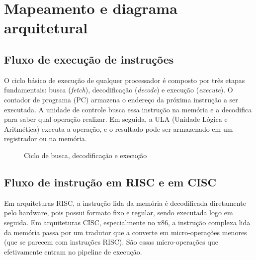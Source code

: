 \chapter{Mapeamento e diagrama arquitetural}
\label{cap:diagramas}

\section{Fluxo de execução de instruções}
O ciclo básico de execução de qualquer processador é composto por três etapas fundamentais: busca (\textit{fetch}), decodificação (\textit{decode}) e execução (\textit{execute}). O contador de programa (PC) armazena o endereço da próxima instrução a ser executada. A unidade de controle busca essa instrução na memória e a decodifica para saber qual operação realizar. Em seguida, a ULA (Unidade Lógica e Aritmética) executa a operação, e o resultado pode ser armazenado em um registrador ou na memória.

\begin{figure}[htbp]
    \centering
    \caption{Ciclo de busca, decodificação e execução}
    \label{fig:ciclo}
\end{figure}

\section{Fluxo de instrução em RISC e em CISC}
Em arquiteturas RISC, a instrução lida da memória é decodificada diretamente pelo hardware, pois possui formato fixo e regular, sendo executada logo em seguida. Em arquiteturas CISC, especialmente no x86, a instrução complexa lida da memória passa por um tradutor que a converte em micro-operações menores (que se parecem com instruções RISC). São essas micro-operações que efetivamente entram no pipeline de execução.

